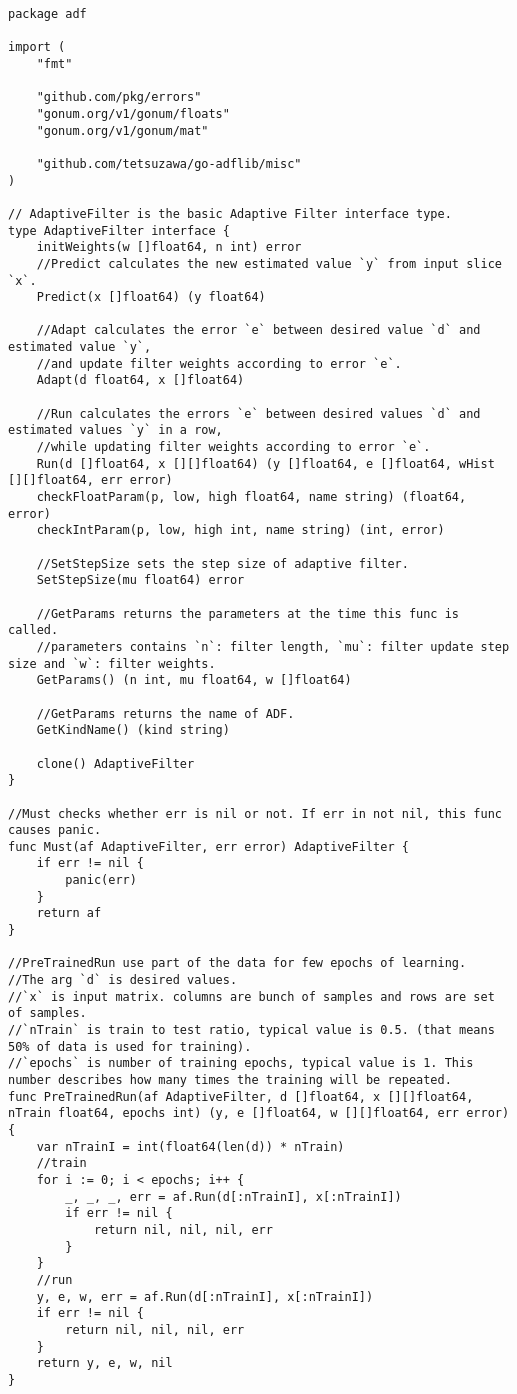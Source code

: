 \begin{lstlisting}[caption=base.go,label=base.go]
package adf

import (
	"fmt"

	"github.com/pkg/errors"
	"gonum.org/v1/gonum/floats"
	"gonum.org/v1/gonum/mat"

	"github.com/tetsuzawa/go-adflib/misc"
)

// AdaptiveFilter is the basic Adaptive Filter interface type.
type AdaptiveFilter interface {
	initWeights(w []float64, n int) error
	//Predict calculates the new estimated value `y` from input slice `x`.
	Predict(x []float64) (y float64)

	//Adapt calculates the error `e` between desired value `d` and estimated value `y`,
	//and update filter weights according to error `e`.
	Adapt(d float64, x []float64)

	//Run calculates the errors `e` between desired values `d` and estimated values `y` in a row,
	//while updating filter weights according to error `e`.
	Run(d []float64, x [][]float64) (y []float64, e []float64, wHist [][]float64, err error)
	checkFloatParam(p, low, high float64, name string) (float64, error)
	checkIntParam(p, low, high int, name string) (int, error)

	//SetStepSize sets the step size of adaptive filter.
	SetStepSize(mu float64) error

	//GetParams returns the parameters at the time this func is called.
	//parameters contains `n`: filter length, `mu`: filter update step size and `w`: filter weights.
	GetParams() (n int, mu float64, w []float64)

	//GetParams returns the name of ADF.
	GetKindName() (kind string)

	clone() AdaptiveFilter
}

//Must checks whether err is nil or not. If err in not nil, this func causes panic.
func Must(af AdaptiveFilter, err error) AdaptiveFilter {
	if err != nil {
		panic(err)
	}
	return af
}

//PreTrainedRun use part of the data for few epochs of learning.
//The arg `d` is desired values.
//`x` is input matrix. columns are bunch of samples and rows are set of samples.
//`nTrain` is train to test ratio, typical value is 0.5. (that means 50% of data is used for training).
//`epochs` is number of training epochs, typical value is 1. This number describes how many times the training will be repeated.
func PreTrainedRun(af AdaptiveFilter, d []float64, x [][]float64, nTrain float64, epochs int) (y, e []float64, w [][]float64, err error) {
	var nTrainI = int(float64(len(d)) * nTrain)
	//train
	for i := 0; i < epochs; i++ {
		_, _, _, err = af.Run(d[:nTrainI], x[:nTrainI])
		if err != nil {
			return nil, nil, nil, err
		}
	}
	//run
	y, e, w, err = af.Run(d[:nTrainI], x[:nTrainI])
	if err != nil {
		return nil, nil, nil, err
	}
	return y, e, w, nil
}


\end{lstlisting}
